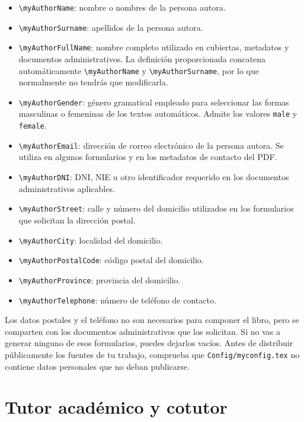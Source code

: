 \begin{itemize}
  \item \texttt{\textbackslash{}myAuthorName}: nombre o nombres de la persona autora.
  \item \texttt{\textbackslash{}myAuthorSurname}: apellidos de la persona autora.
  \item \texttt{\textbackslash{}myAuthorFullName}: nombre completo utilizado en cubiertas, metadatos y documentos administrativos. La definición proporcionada concatena automáticamente \texttt{\textbackslash{}myAuthorName} y \texttt{\textbackslash{}myAuthorSurname}, por lo que normalmente no tendrás que modificarla.
  \item \texttt{\textbackslash{}myAuthorGender}: género gramatical empleado para seleccionar las formas masculinas o femeninas de los textos automáticos. Admite los valores \texttt{male} y \texttt{female}.
  \item \texttt{\textbackslash{}myAuthorEmail}: dirección de correo electrónico de la persona autora. Se utiliza en algunos formularios y en los metadatos de contacto del PDF.
  \item \texttt{\textbackslash{}myAuthorDNI}: DNI, NIE u otro identificador requerido en los documentos administrativos aplicables.
  \item \texttt{\textbackslash{}myAuthorStreet}: calle y número del domicilio utilizados en los formularios que solicitan la dirección postal.
  \item \texttt{\textbackslash{}myAuthorCity}: localidad del domicilio.
  \item \texttt{\textbackslash{}myAuthorPostalCode}: código postal del domicilio.
  \item \texttt{\textbackslash{}myAuthorProvince}: provincia del domicilio.
  \item \texttt{\textbackslash{}myAuthorTelephone}: número de teléfono de contacto.
\end{itemize}

Los datos postales y el teléfono no son necesarios para componer el libro, pero se comparten con los documentos administrativos que los solicitan. Si no vas a generar ninguno de esos formularios, puedes dejarlos vacíos. Antes de distribuir públicamente los fuentes de tu trabajo, comprueba que \texttt{Config/myconfig.tex} no contiene datos personales que no deban publicarse.

\section{Tutor académico y cotutor}

